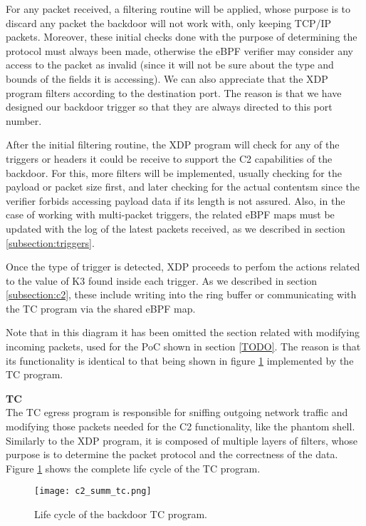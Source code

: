For any packet received, a filtering routine will be applied, whose purpose is to discard any packet the backdoor will not work with, only keeping TCP/IP packets. Moreover, these initial checks done with the purpose of determining the protocol must always been made, otherwise the eBPF verifier may consider any access to the packet as invalid (since it will not be sure about the type and bounds of the fields it is accessing). We can also appreciate that the XDP program filters according to the destination port. The reason is that we have designed our backdoor trigger so that they are always directed to this port number.

After the initial filtering routine, the XDP program will check for any of the triggers or headers it could be receive to support the C2 capabilities of the backdoor. For this, more filters will be implemented, usually checking for the payload or packet size first, and later checking for the actual contentsm since the verifier forbids accessing payload data if its length is not assured. Also, in the case of working with multi-packet triggers, the related eBPF maps must be updated with the log of the latest packets received, as we described in section \ref{subsection:triggers}.

Once the type of trigger is detected, XDP proceeds to perfom the actions related to the value of K3 found inside each trigger. As we described in section \ref{subsection:c2}, these include writing into the ring buffer or communicating with the TC program via the shared eBPF map.

Note that in this diagram it has been omitted the section related with modifying incoming packets, used for the PoC shown in section \ref{TODO}. The reason is that its functionality is identical to that being shown in figure \ref{fig:c2_summ_tc} implemented by the TC program.


\textbf{TC}\\
The TC egress program is responsible for sniffing outgoing network traffic and modifying those packets needed for the C2 functionality, like the phantom shell. Similarly to the XDP program, it is composed of multiple layers of filters, whose purpose is to determine the packet protocol and the correctness of the data. Figure \ref{fig:c2_summ_tc} shows the complete life cycle of the TC program.

\begin{figure}[htbp]
	\centering
	\texttt{[image: c2\_summ\_tc.png]}
	\caption{Life cycle of the backdoor TC program.}
	\label{fig:c2_summ_tc}
\end{figure}

